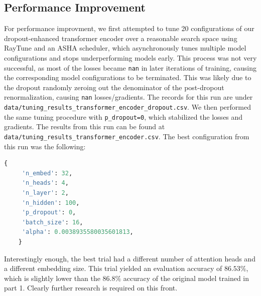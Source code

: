 \documentclass[10pt]{article}
\newcommand{\code}[1]{\texttt{#1}}
\theoremstyle{definition}
\begin{document}
\subsection{Performance Improvement}
\noindent For performance improvment, we first attempted to tune 20 configurations of our dropout-enhanced transformer encoder over a reasonable search space using RayTune and an ASHA scheduler, which asynchronously tunes multiple model configurations and stops underperforming models early. This process was not very successful, as most of the losses became \code{nan} in later iterations of training, causing the corresponding model configurations to be terminated. This was likely due to the dropout randomly zeroing out the denominator of the post-dropout renormalization, causing \code{nan} losses/gradients. The records for this run are under \code{data/tuning\_results\_transformer\_encoder\_dropout.csv}. We then performed the same tuning procedure with \code{p\_dropout=0}, which stabilized the losses and gradients. The results from this run can be found at \code{data/tuning\_results\_transformer\_encoder.csv}. The best configuration from this run was the following:
\newpage
\begin{lstlisting}[language=Python, basicstyle=\ttfamily\small, frame=single] 
    {
     'n_embed': 32,
     'n_heads': 4,
     'n_layer': 2,
     'n_hidden': 100,
     'p_dropout': 0,
     'batch_size': 16,
     'alpha': 0.0038935580035601813, 
    } 
\end{lstlisting}

\noindent Interestingly enough, the best trial had a different number of attention heads and a different embedding size. This trial yielded an evaluation accuracy of $86.53\%$, which is slightly lower than the $86.8\%$ accuracy of the original model trained in part 1. Clearly further research is required on this front.


\end{document}
